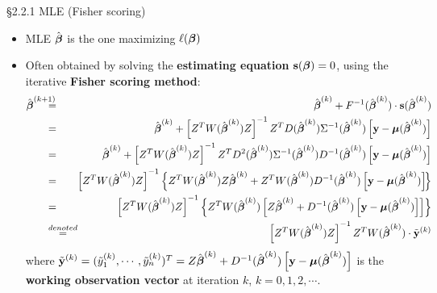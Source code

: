 \documentclass{beamer}
\begin{document}
\begin{frame}{\S2.2.1 MLE (Fisher scoring)}
\begin{itemize}
\item
MLE $\hat{\mbox{\boldmath $\beta$}}$ is the one maximizing $\ell(\mbox{\boldmath $\beta$})$

\item Often obtained by solving the \textbf{estimating equation} $\textbf{s}(\mbox{\boldmath $\beta$})=0$, using the iterative \textbf{Fisher scoring method}: {\scriptsize
\begin{eqnarray*}
\hat{\mbox{\boldmath $\beta$}}^{(k+1)}&\!\!\!\!\!\!=\!\!\!\!\!\! & \hat{\mbox{\boldmath $\beta$}}^{(k)}+
F^{-1}(\hat{\mbox{\boldmath $\beta$}}^{(k)})\cdot \textbf{s}(\hat{\mbox{\boldmath $\beta$}}^{(k)}) \\
&\!\!\!\!\!\!=\!\!\!\!\!\! & \hat{\mbox{\boldmath $\beta$}}^{(k)}+ 
\left[Z^TW(\hat{\mbox{\boldmath $\beta$}}^{(k)})Z\right]^{-1}
 Z^TD(\hat{\mbox{\boldmath $\beta$}}^{(k)})\Sigma^{-1}(\hat{\mbox{\boldmath $\beta$}}^{(k)})
\left[\textbf{y}-\mbox{\boldmath $\mu$}(\hat{\mbox{\boldmath $\beta$}}^{(k)})\right] \\
&\!\!\!\!\!\!=\!\!\!\!\!\! & \hat{\mbox{\boldmath $\beta$}}^{(k)}+ 
\left[Z^TW(\hat{\mbox{\boldmath $\beta$}}^{(k)})Z\right]^{-1}
 Z^TD^2(\hat{\mbox{\boldmath $\beta$}}^{(k)})\Sigma^{-1}(\hat{\mbox{\boldmath $\beta$}}^{(k)})
D^{-1}(\hat{\mbox{\boldmath $\beta$}}^{(k)}) 
\left[\textbf{y}-\mbox{\boldmath $\mu$}(\hat{\mbox{\boldmath $\beta$}}^{(k)})\right] \\
&\!\!\!\!\!\!=\!\!\!\!\!\! & \left[Z^TW(\hat{\mbox{\boldmath $\beta$}}^{(k)})Z\right]^{-1}\left\{
Z^TW(\hat{\mbox{\boldmath $\beta$}}^{(k)})Z \hat{\mbox{\boldmath $\beta$}}^{(k)}
+Z^TW(\hat{\mbox{\boldmath $\beta$}}^{(k)}) D^{-1}(\hat{\mbox{\boldmath $\beta$}}^{(k)})
\left[\textbf{y}-\mbox{\boldmath $\mu$}(\hat{\mbox{\boldmath $\beta$}}^{(k)})\right]\!\right\} \\
&\!\!\!\!\!\!=\!\!\!\!\!\!& \left[Z^TW(\hat{\mbox{\boldmath $\beta$}}^{(k)})Z\right]^{-1}\left\{
Z^TW(\hat{\mbox{\boldmath $\beta$}}^{(k)})\left[Z \hat{\mbox{\boldmath $\beta$}}^{(k)}
+ D^{-1}(\hat{\mbox{\boldmath $\beta$}}^{(k)})
\left[\textbf{y}-\mbox{\boldmath $\mu$}(\hat{\mbox{\boldmath $\beta$}}^{(k)})\right]\right]\right\} \\
&\!\!\!\!\!\!\stackrel{denoted}{=}\!\!\!\!\!\! & \left[Z^TW(\hat{\mbox{\boldmath $\beta$}}^{(k)})Z\right]^{-1}
Z^TW(\hat{\mbox{\boldmath $\beta$}}^{(k)})\cdot \tilde{\textbf{y}}^{(k)}
\end{eqnarray*}}
where $\tilde{\textbf{y}}^{(k)}=(\tilde{y}_1^{(k)},\cdots, \tilde{y}_n^{(k)})^T
=Z \hat{\mbox{\boldmath $\beta$}}^{(k)}+ D^{-1}(\hat{\mbox{\boldmath $\beta$}}^{(k)})
\left[\textbf{y}-\mbox{\boldmath $\mu$}(\hat{\mbox{\boldmath $\beta$}}^{(k)})\right]$
is the \textbf{working observation vector} at iteration $k$, $k=0,1,2,\cdots$.
\end{itemize}
\end{frame}
\end{document}
